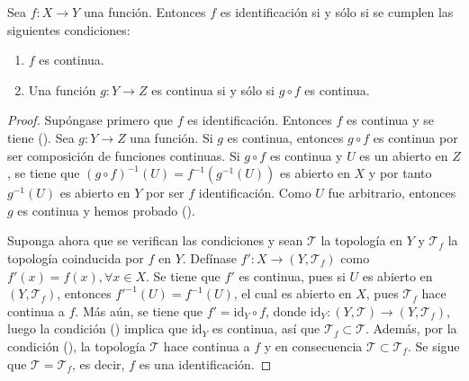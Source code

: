 

\begin{theorem}
Sea $f : X \longrightarrow Y$ una función. Entonces $f$ es identificación si y sólo si se cumplen las siguientes condiciones:
\begin{enumerate}[label=\textnormal{(\roman*)}]
\item $f$ es continua.
\item Una función $g : Y \longrightarrow Z$ es continua si y sólo si $g \circ f$ es continua.
\end{enumerate}
\bigskip

\end{theorem}

\begin{proof}
Supóngase primero que $f$ es identificación. Entonces $f$ es continua y se tiene ({\scshape{}}). Sea $g : Y \longrightarrow Z$ una función. Si $g$ es continua, entonces $g \circ f$ es continua por ser composición de funciones continuas. Si $g \circ f$ es continua y $U$ es un abierto en $Z$, se tiene que $(g \circ f)^{-1}(U) = f^{-1}(g^{-1}(U))$ es abierto en $X$ y por tanto $g^{-1}(U)$ es abierto en $Y$ por ser $f$ identificación. Como $U$ fue arbitrario, entonces $g$ es continua y hemos probado ({\scshape{}}).
\bigskip

Suponga ahora que se verifican las condiciones y sean $\mathcal{T}$ la topología en $Y$ y $\mathcal{T}_f$ la topología coinducida por $f$ en $Y$. Defínase $f' : X \longrightarrow (Y,\mathcal{T}_f)$ como $f'(x) = f(x), \forall x \in X$. Se tiene que $f'$ es continua, pues si $U$ es abierto en $(Y,\mathcal{T}_f)$, entonces $f'^{-1}(U) = f^{-1}(U)$, el cual es abierto en $X$, pues $\mathcal{T}_f$ hace continua a $f$. Más aún, se tiene que $f' = \text{id}_Y \circ f$, donde $\text{id}_Y : (Y,\mathcal{T}) \longrightarrow (Y,\mathcal{T}_f)$, luego la condición ({\scshape{}}) implica que $\text{id}_Y$ es continua, así que $\mathcal{T}_f \subset \mathcal{T}$. Además, por la condición ({\scshape{}}), la topología $\mathcal{T}$ hace continua a $f$ y en consecuencia $\mathcal{T} \subset \mathcal{T}_f$. Se sigue que $\mathcal{T} = \mathcal{T}_f$, es decir, $f$ es una identificación.
\end{proof}
